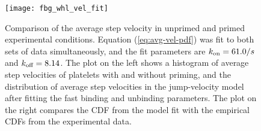 \documentclass{biophys-new}
\begin{document}

\begin{figure}
  \centering
  \texttt{[image: fbg\_whl\_vel\_fit]}
  \caption[Fits to average step velocity]{Comparison of the average
    step velocity in unprimed and primed experimental
    conditions. Equation (\ref{eq:avg-vel-pdf}) was fit to both sets
    of data simultaneously, and the fit parameters are
    $k_\textnormal{on} = 61.0 / s$ and $k_\textnormal{off} = 8.14$. The plot on the
    left shows a histogram of average step velocities of platelets
    with and without priming, and the distribution of average step
    velocities in the jump-velocity model after fitting the fast
    binding and unbinding parameters. The plot on the right compares
    the CDF from the model fit with the empirical CDFs from the
    experimental data.}
  \label{fig:fbg-whl-vel-fit}
\end{figure}

\end{document}
